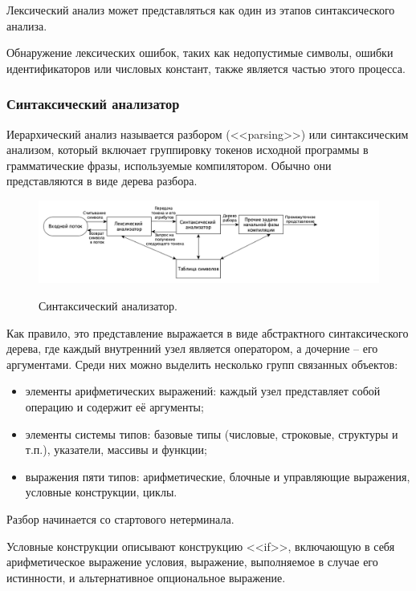 Лексический анализ может представляться как один из этапов синтаксического анализа. 

Обнаружение лексических ошибок, таких как недопустимые символы, ошибки идентификаторов или числовых констант, также является частью этого процесса. \\

\subsubsection{Синтаксический анализатор}
Иерархический анализ называется разбором (<<parsing>>) или синтаксическим анализом, который включает группировку токенов исходной программы в грамматические фразы, используемые компилятором. Обычно они представляются в виде дерева разбора.

\begin{figure}[h!]
	\begin{center}
		{\includegraphics[scale = 0.55, page=1]{img/parser.png}}
		\caption{Синтаксический анализатор.}
		\label{fig:parser}
	\end{center}
\end{figure} 

Как правило, это представление выражается в виде абстрактного синтаксического дерева, где каждый внутренний узел является оператором, а дочерние -- его аргументами. Среди них можно выделить несколько групп связанных объектов:
\begin{itemize}
	\item элементы арифметических выражений: каждый узел представляет собой операцию и содержит её аргументы;
	
	\item элементы системы типов: базовые типы (числовые, строковые, структуры и т.п.), указатели, массивы и функции;
	 
	\item выражения пяти типов: арифметические, блочные и управляющие выражения, условные конструкции, циклы.
\end{itemize}

Разбор начинается со стартового нетерминала. 

Условные конструкции описывают конструкцию <<if>>, включающую в себя арифметическое выражение условия, выражение, выполняемое в случае его истинности, и альтернативное опциональное выражение.

